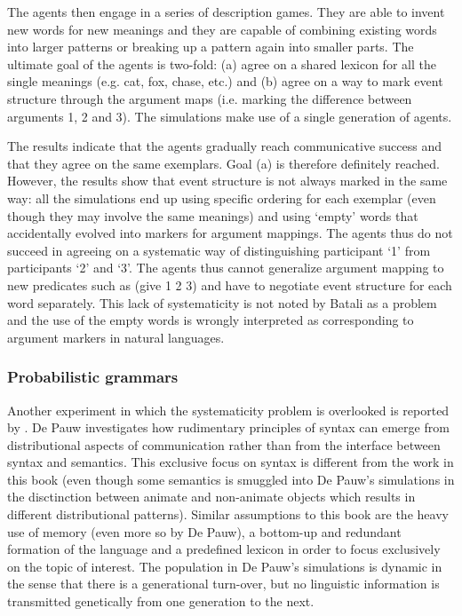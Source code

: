 The agents then engage in a series of description games. They are able to invent new words for new meanings and they are capable of combining existing words into larger patterns or breaking up a pattern again into smaller parts. The ultimate goal of the agents is two-fold: (a) agree on a shared lexicon for all the single meanings (e.g. cat, fox, chase, etc.) and (b) agree on a way to mark event structure through the argument maps (i.e. marking the difference between arguments 1, 2 and 3). The simulations make use of a single generation of agents.

The results indicate that the agents gradually reach communicative success and that they agree on the same exemplars. Goal (a) is therefore definitely reached. However, the results show that event structure is not always marked in the same way: all the simulations end up using specific ordering for each exemplar (even though they may involve the same meanings) and using `empty' words that accidentally evolved into markers for argument mappings. The agents thus do not succeed in agreeing on a systematic way of distinguishing participant `1' from participants `2' and `3'. The agents thus cannot generalize argument mapping to new predicates such as (give 1 2 3) and have to negotiate event structure for each word separately. This lack of systematicity is not noted by Batali as a problem and the use of the empty words is wrongly interpreted as corresponding to argument markers in natural languages.


\subsubsection{Probabilistic grammars}
 Another experiment in which the systematicity problem is overlooked is reported by \citet[chapter 10]{depauw02grael}. De Pauw investigates how rudimentary principles of syntax can emerge from distributional aspects of communication rather than from the interface between syntax and semantics. This exclusive focus on syntax is different from the work in this book (even though some semantics is smuggled into De Pauw's simulations in the disctinction between animate and non-animate objects which results in different distributional patterns). Similar assumptions to this book are the heavy use of memory (even more so by De Pauw), a bottom-up and redundant formation of the language and a predefined lexicon in order to focus exclusively on the topic of interest. The population in De Pauw's simulations is dynamic in the sense that there is a generational turn-over, but no linguistic information is transmitted genetically from one generation to the next.

